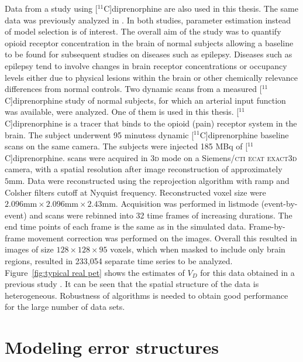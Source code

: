 Data from a \pet study using [$^{11}$C]diprenorphine are also used in this
thesis. The same data was previously analyzed in
\cite{Peng:2008fx,Jiang:2009kf}. In both studies, parameter estimation
instead of model selection is of interest. The overall aim of the study was
to quantify opioid receptor concentration in the brain of normal subjects
allowing a baseline to be found for subsequent studies on diseases such as
epilepsy. Diseases such as epilepsy tend to involve changes in brain receptor
concentrations or occupancy levels either due to physical lesions within the
brain or other chemically relevance differences from normal controls. Two
dynamic scans from a measured [$^{11}$C]diprenorphine study of normal
subjects, for which an arterial input function was available, were analyzed.
One of them is used in this thesis. [$^{11}$C]diprenorphine is a tracer that
binds to the opioid (pain) receptor system in the brain. The subject
underwent 95 minutess dynamic [$^{11}$C]diprenorphine \pet baseline scans on
the same camera. The subjects were injected 185 MBq of
[$^{11}$C]diprenorphine. \pet scans were acquired in \textsc{3d} mode on a
Siemens/\textsc{cti ecat exact3d} \pet camera, with a spatial resolution
after image reconstruction of approximately $5\text{mm}$. Data were
reconstructed using the reprojection algorithm \citep{Kinahan1989} with ramp
and Colsher filters cutoff at Nyquist frequency. Reconstructed voxel size
were $2.096 \text{mm} \times 2.096 \text{mm} \times2.43 \text{mm}$.
Acquisition was performed in listmode (event-by-event) and scans were
rebinned into 32 time frames of increasing durations. The end time points of
each frame is the same as in the simulated data. Frame-by-frame movement
correction was performed on the \pet images. Overall this resulted in images
of size $128\times128\times95$ voxels, which when masked to include only
brain regions, resulted in 233,054 separate time series to be analyzed.
Figure~\ref{fig:typical real pet} shows the estimates of $V_D$ for this data
obtained in a previous study \cite{Zhou2013}. It can be seen that the spatial
structure of the data is heterogeneous. Robustness of algorithms is needed to
obtain good performance for the large number of data sets.



\section{Modeling error structures}
\label{sec:Error models}

